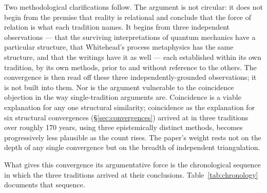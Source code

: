 Two methodological clarifications follow.
The argument is not circular: it does not begin from the premise that
reality is relational and conclude that the force of relation is what
each tradition names.
It begins from three independent observations --- that the surviving
interpretations of quantum mechanics have a particular structure, that
Whitehead's process metaphysics has the same structure, and that the
\bahai writings have it as well --- each established within its own
tradition, by its own methods, prior to and without reference to the
others.
The convergence is then read off these three independently-grounded
observations; it is not built into them.
Nor is the argument vulnerable to the coincidence objection in the way
single-tradition arguments are.
Coincidence is a viable explanation for any one structural similarity;
coincidence as the explanation for six structural convergences
(\S\ref{sec:convergences}) arrived at in three traditions over
roughly 170 years, using three epistemically distinct methods, becomes
progressively less plausible as the count rises.
The paper's weight rests not on the depth of any single convergence but
on the breadth of independent triangulation.

What gives this convergence its argumentative force is the chronological
sequence in which the three traditions arrived at their conclusions.
Table~\ref{tab:chronology} documents that sequence.

